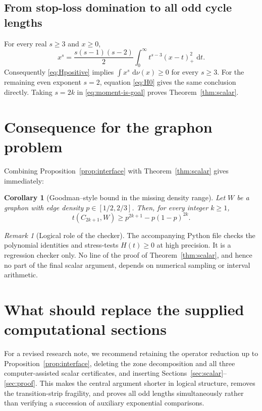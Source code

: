 \documentclass[11pt]{article}
\newtheorem{corollary}[theorem]{Corollary}
\theoremstyle{remark}
\newtheorem{remark}[theorem]{Remark}
\newcommand{\dd}{\,\mathrm d}
\begin{document}
\subsection*{From stop-loss domination to all odd cycle lengths}
For every real $s\ge3$ and $x\ge0$,
\begin{equation}\label{eq:integral-representation}
 x^s=\frac{s(s-1)(s-2)}2
 \int_0^\infty t^{s-3}(x-t)_+^2\,\dd t.
\end{equation}
Consequently \eqref{eq:Hpositive} implies
$\int x^s\,\dd\nu(x)\ge0$ for every $s\ge3$.  For the remaining even exponent
$s=2$, equation \eqref{eq:H0} gives the same conclusion directly.  Taking
$s=2k$ in \eqref{eq:moment-is-goal} proves
Theorem~\ref{thm:scalar}.

\section{Consequence for the graphon problem}

Combining Proposition~\ref{prop:interface} with
Theorem~\ref{thm:scalar} gives immediately:

\begin{corollary}[Goodman--style bound in the missing density range]
\label{cor:main}
Let $W$ be a graphon with edge density $p\in[1/2,2/3]$.  Then, for every
integer $k\ge1$,
\[
 t(C_{2k+1},W)\ge p^{2k+1}-p(1-p)^{2k}.
\]
\end{corollary}

\begin{remark}[Logical role of the checker]
The accompanying Python file checks the polynomial identities and stress-tests
$H(t)\ge0$ at high precision.  It is a regression checker only.  No line of
the proof of Theorem~\ref{thm:scalar}, and hence no part of the final scalar
argument, depends on numerical sampling or interval arithmetic.
\end{remark}

\section{What should replace the supplied computational sections}

For a revised research note, we recommend retaining the operator reduction up
to Proposition~\ref{prop:interface}, deleting the zone decomposition and all
three computer-assisted scalar certificates, and inserting
Sections~\ref{sec:scalar}--\ref{sec:proof}.  This makes the central argument
shorter in logical structure, removes the transition-strip fragility, and
proves all odd lengths simultaneously rather than verifying a succession of
auxiliary exponential comparisons.
\end{document}
